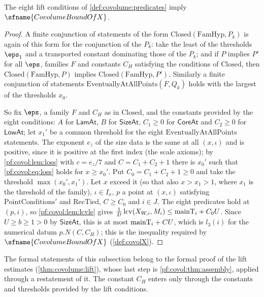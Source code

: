 \begin{theorem}\label{pf:covol:thm:assembly}
The eight lift conditions of \cref{def:covolume:predicates} imply $\sfname{CovolumeBoundOfX}$.
\end{theorem}

\begin{proof}
A finite conjunction of statements of the form $\mathrm{Closed}(\mathrm{FamHyp},P_k)$ is again of this form
for the conjunction of the $P_k$: take the least of the thresholds $\eps_1$ and a transported constant
dominating those of the $P_k$; and if $P$ implies $P'$ for all $\eps$, families $F$ and constants $C_H$
satisfying the conditions of $\mathrm{Closed}$, then $\mathrm{Closed}(\mathrm{FamHyp},P)$ implies
$\mathrm{Closed}(\mathrm{FamHyp},P')$. Similarly a finite conjunction of statements
$\mathrm{EventuallyAtAllPoints}(F,Q_k)$ holds with the largest of the thresholds $x_0$.

So fix $\eps$, a family $F$ and $C_H$ as in $\mathrm{Closed}$, and the constants provided by the eight
conditions: $A$ for $\mathsf{LamAt}$, $B$ for $\mathsf{SizeAt}$, $C_1\ge0$ for $\mathsf{CoreAt}$ and
$C_2\ge0$ for $\mathsf{LowAt}$; let $x_1'$ be a common threshold for the eight
$\mathrm{EventuallyAtAllPoints}$ statements. The exponent $e_z$ of the size data is the same at all
$(x,\iota)$ and is positive, since it is positive at the first index (the scale axioms); by
\cref{pf:covol:lem:loss} with $c=e_z/7$ and $C=C_1+C_2+1$ there is $x_0'$ such that
\eqref{pf:covol:eq:loss} holds for $x\ge x_0'$. Put $C_0=C_1+C_2+1\ge0$ and take the threshold
$\max(x_0',x_1')$. Let $x$ exceed it (so that also $x>x_1>1$, where $x_1$ is the threshold of the
family), $\iota\in I_x$, $p$ a point at $(x,\iota)$ satisfying $\mathrm{PointConditions}'$ and
$\mathrm{RecTied}$, $C\ge C_0$ and $i\in J$. The eight predicates hold at $(p,i)$, so
\cref{pf:covol:lem:lcvle} gives $\frac1D\operatorname{lcv}(X_{W,i},M_i)\le\mathrm{mainT}_i+C_0U$. Since $U\ge b\ge1>0$ by
$\mathsf{SizeAt}$, this is at most $\mathrm{mainT}_i+CU$, which is $l_3(i)$ for the numerical datum
$p.N(C,C_H)$; this is the inequality required by $\sfname{CovolumeBoundOfX}$ (\cref{def:covolX}).
\end{proof}

\begin{remark}\label{pf:covol:rem:assembly}
The formal statements of this subsection belong to the formal proof of the lift estimates
(\cref{thm:covolume:lift}), whose last step is \cref{pf:covol:thm:assembly}, applied through a
restatement of it. The constant $C_H$ enters only through the constants and thresholds provided by the
lift conditions.
\end{remark}

